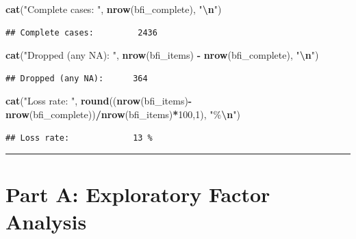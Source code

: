 \documentclass[
]{article}
\newenvironment{Shaded}{\begin{snugshade}}{\end{snugshade}}
\newcommand{\DecValTok}[1]{\textcolor[rgb]{0.00,0.00,0.81}{#1}}
\newcommand{\FunctionTok}[1]{\textcolor[rgb]{0.13,0.29,0.53}{\textbf{#1}}}
\newcommand{\NormalTok}[1]{#1}
\newcommand{\SpecialCharTok}[1]{\textcolor[rgb]{0.81,0.36,0.00}{\textbf{#1}}}
\newcommand{\StringTok}[1]{\textcolor[rgb]{0.31,0.60,0.02}{#1}}
\begin{document}
\begin{Shaded}
\begin{Highlighting}[]
\FunctionTok{cat}\NormalTok{(}\StringTok{"Complete cases:        "}\NormalTok{, }\FunctionTok{nrow}\NormalTok{(bfi\_complete), }\StringTok{"}\SpecialCharTok{\textbackslash{}n}\StringTok{"}\NormalTok{)}
\end{Highlighting}
\end{Shaded}

\begin{verbatim}
## Complete cases:         2436
\end{verbatim}

\begin{Shaded}
\begin{Highlighting}[]
\FunctionTok{cat}\NormalTok{(}\StringTok{"Dropped (any NA):     "}\NormalTok{, }\FunctionTok{nrow}\NormalTok{(bfi\_items) }\SpecialCharTok{{-}} \FunctionTok{nrow}\NormalTok{(bfi\_complete), }\StringTok{"}\SpecialCharTok{\textbackslash{}n}\StringTok{"}\NormalTok{)}
\end{Highlighting}
\end{Shaded}

\begin{verbatim}
## Dropped (any NA):      364
\end{verbatim}

\begin{Shaded}
\begin{Highlighting}[]
\FunctionTok{cat}\NormalTok{(}\StringTok{"Loss rate:            "}\NormalTok{, }\FunctionTok{round}\NormalTok{((}\FunctionTok{nrow}\NormalTok{(bfi\_items)}\SpecialCharTok{{-}}\FunctionTok{nrow}\NormalTok{(bfi\_complete))}\SpecialCharTok{/}\FunctionTok{nrow}\NormalTok{(bfi\_items)}\SpecialCharTok{*}\DecValTok{100}\NormalTok{,}\DecValTok{1}\NormalTok{), }\StringTok{"\%}\SpecialCharTok{\textbackslash{}n}\StringTok{"}\NormalTok{)}
\end{Highlighting}
\end{Shaded}

\begin{verbatim}
## Loss rate:             13 %
\end{verbatim}

\begin{center}\rule{0.5\linewidth}{0.5pt}\end{center}

\section{Part A: Exploratory Factor
Analysis}\label{part-a-exploratory-factor-analysis}
\end{document}
